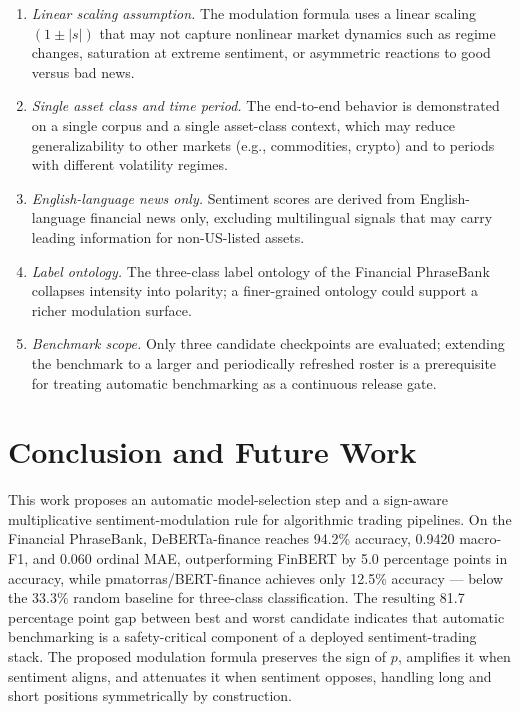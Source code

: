 \documentclass[conference]{IEEEtran}
\begin{document}
\begin{enumerate}

\item \textit{Linear scaling assumption.} The modulation formula uses a
linear scaling $(1 \pm |s|)$ that may not capture nonlinear market dynamics
such as regime changes, saturation at extreme sentiment, or asymmetric
reactions to good versus bad news.

\item \textit{Single asset class and time period.} The end-to-end behavior is
demonstrated on a single corpus and a single asset-class context, which may
reduce generalizability to other markets (e.g., commodities, crypto) and to
periods with different volatility regimes.

\item \textit{English-language news only.} Sentiment scores are derived from
English-language financial news only, excluding multilingual signals that may
carry leading information for non-US-listed assets.

\item \textit{Label ontology.} The three-class label ontology of the
Financial PhraseBank collapses intensity into polarity; a finer-grained
ontology could support a richer modulation surface.

\item \textit{Benchmark scope.} Only three candidate checkpoints are
evaluated; extending the benchmark to a larger and periodically refreshed
roster is a prerequisite for treating automatic benchmarking as a continuous
release gate.

\end{enumerate}

\section{Conclusion and Future Work}

This work proposes an automatic model-selection step and a sign-aware
multiplicative sentiment-modulation rule for algorithmic trading pipelines.
On the Financial PhraseBank, DeBERTa-finance reaches 94.2\% accuracy, 0.9420
macro-F1, and 0.060 ordinal MAE, outperforming FinBERT by 5.0 percentage
points in accuracy, while pmatorras/BERT-finance achieves only 12.5\%
accuracy --- below the 33.3\% random baseline for three-class classification.
The resulting 81.7 percentage point gap between best and worst candidate
indicates that automatic benchmarking is a safety-critical component of a
deployed sentiment-trading stack. The proposed modulation formula preserves
the sign of $p$, amplifies it when sentiment aligns, and attenuates it when
sentiment opposes, handling long and short positions symmetrically by
construction.
\end{document}
